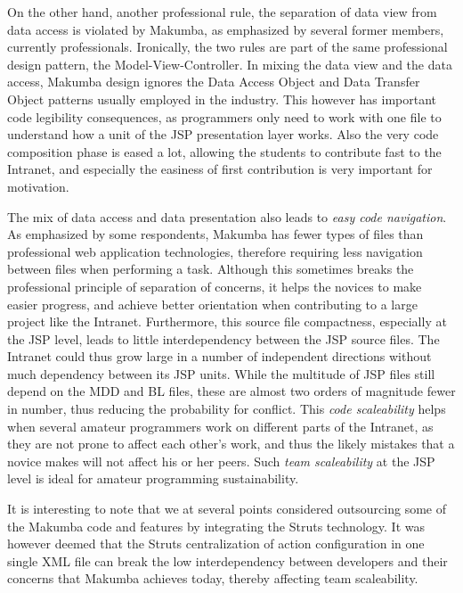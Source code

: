 \documentclass{llncs}
\begin{document}
On the other hand, another professional rule, the separation of data view from data access is violated by Makumba, as emphasized by several former members, currently professionals. Ironically, the two rules are part of the same professional design pattern, the Model-View-Controller. In mixing the data view and the data access, Makumba design ignores the Data Access Object and Data Transfer Object patterns usually employed in the industry. This however has important code legibility consequences, as programmers only need to work with one file to understand how a unit of the JSP presentation layer works. Also the very code composition phase is eased a lot, allowing the students to contribute fast to the Intranet, and especially the easiness of first contribution is very important for motivation. 

The mix of data access and data presentation also leads to \textit{easy code navigation}.  As emphasized by some respondents, Makumba has fewer types of files than professional web application technologies, therefore requiring less navigation between files when performing a task. Although this sometimes breaks the professional principle of separation of concerns, it helps the novices to make easier progress, and achieve better orientation when contributing to a large project like the Intranet. Furthermore, this source file compactness, especially at the JSP level, leads to little interdependency between the JSP source files. The Intranet could thus grow large in a number of independent directions without much dependency between its JSP units. While the multitude of JSP files still depend on the MDD and BL files, these are almost two orders of magnitude fewer in number, thus reducing the probability for conflict. This \textit{code scaleability}  helps when several amateur programmers work on different parts of the Intranet, as they are not prone to affect each other's work, and thus the likely mistakes that a novice makes will not affect his or her peers. Such \textit{team scaleability} at the JSP level is ideal for amateur programming sustainability.

It is interesting to note that we at several points considered outsourcing some of the Makumba code and features by integrating the Struts technology. It was however deemed that the Struts centralization of action configuration in one single XML file can break the low interdependency between developers and their concerns that Makumba achieves today, thereby affecting team scaleability.
\end{document}
